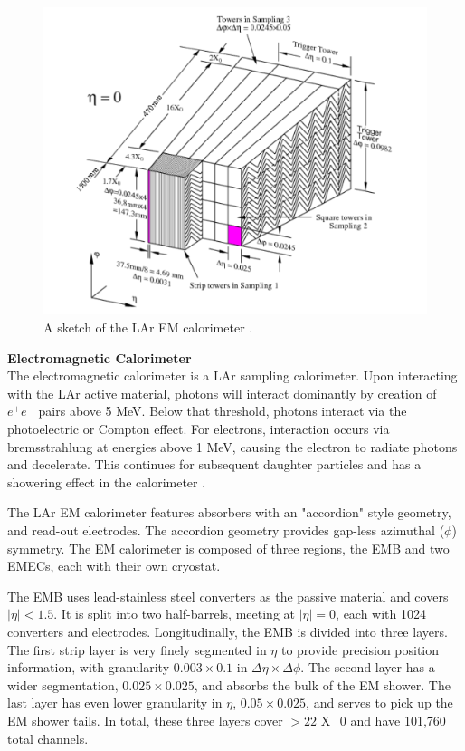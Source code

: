\begin{figure}[!ht]
    \centering
    \includegraphics[width=.9\textwidth]{chapters/chapter2_experiment/images/lar.png}
    \caption{A sketch of the \gls{LAr} \gls{EM} calorimeter \cite{lar-tdr}.}
    \label{fig:lar}
\end{figure}

\noindent\textbf{Electromagnetic Calorimeter}\\
\indent The electromagnetic calorimeter is a \gls{LAr} sampling calorimeter. Upon interacting with the \gls{LAr} active material, photons will interact dominantly by creation of $e^+e^-$ pairs above 5 MeV. Below that threshold, photons interact via the photoelectric or Compton effect. For electrons, interaction occurs via bremsstrahlung at energies above 1 MeV, causing the electron to radiate photons and decelerate. This continues for subsequent daughter particles and has a showering effect in the calorimeter \cite{detectors-for-radiation}.

The \gls{LAr} \gls{EM} calorimeter features absorbers with an "accordion" style geometry, and read-out electrodes. The accordion geometry provides gap-less azimuthal ($\phi$) symmetry. The \gls{EM} calorimeter is composed of three regions, the \gls{EMB} and two \glspl{EMEC}, each with their own cryostat.

The \gls{EMB} uses lead-stainless steel converters as the passive material and covers $|\eta| < 1.5$. It is split into two half-barrels, meeting at $|\eta| = 0$, each with 1024 converters and electrodes. Longitudinally, the \gls{EMB} is divided into three layers. The first strip layer is very finely segmented in $\eta$ to provide precision position information, with granularity $0.003 \times 0.1$ in $\Delta\eta \times \Delta \phi$. The second layer has a wider segmentation, $0.025 \times 0.025$, and absorbs the bulk of the \gls{EM} shower. The last layer has even lower granularity in $\eta$, $0.05 \times 0.025$, and serves to pick up the \gls{EM} shower tails. In total, these three layers cover $>22$ \gls{X_0} and have 101,760 total channels.

